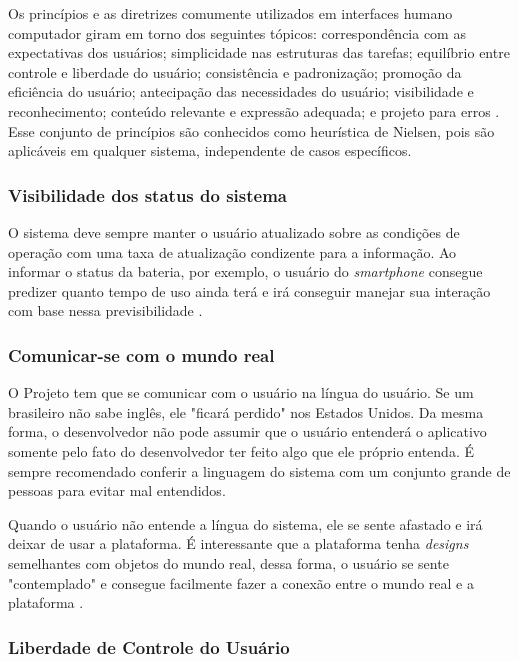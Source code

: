 Os princípios e as diretrizes comumente utilizados em interfaces humano computador giram em torno dos seguintes tópicos: correspondência com as expectativas dos usuários; simplicidade nas estruturas das tarefas; equilíbrio entre controle e liberdade do usuário; consistência e padronização; promoção da eficiência do usuário; antecipação das necessidades do usuário; visibilidade e reconhecimento; conteúdo relevante e expressão adequada; e projeto para erros \cite{BarbosaEtAl2021InteracaoHumanoComputadorExperiencia}.
Esse conjunto de princípios são conhecidos como heurística de Nielsen, pois são aplicáveis em qualquer sistema, independente de casos específicos.

\subsubsection{Visibilidade dos status do sistema}

O sistema deve sempre manter o usuário atualizado sobre as condições de operação com uma taxa de atualização condizente para a informação. Ao informar o status da bateria, por exemplo, o usuário do \textit{smartphone} consegue predizer quanto tempo de uso ainda terá e irá conseguir manejar sua interação com base nessa previsibilidade \cite{site:nielsen}.

\subsubsection{Comunicar-se com o mundo real}
O Projeto tem que se comunicar com o usuário na língua do usuário. Se um brasileiro não sabe inglês, ele "ficará perdido" nos Estados Unidos. Da mesma forma, o desenvolvedor não pode assumir que o usuário entenderá o aplicativo somente pelo fato do desenvolvedor ter feito algo que ele próprio entenda. É sempre recomendado conferir a linguagem do sistema com um conjunto grande de pessoas para evitar mal entendidos.

Quando o usuário não entende a língua do sistema, ele se sente afastado e irá deixar de usar a plataforma. É interessante que a plataforma tenha \textit{designs} semelhantes com objetos do mundo real, dessa forma, o usuário se sente "contemplado" e consegue facilmente fazer a conexão entre o mundo real e a plataforma \cite{site:nielsenRealWorld}.

\subsubsection{Liberdade de Controle do Usuário}

